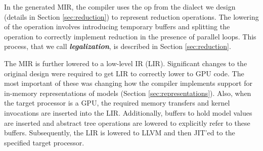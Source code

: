 In the generated MIR, the compiler uses the  op from 
the  dialect we design (details in Section \ref{sec:reduction})
to represent reduction operations. The lowering of the  operation 
involves introducing temporary buffers and splitting the operation  
to correctly implement reduction in the presence of 
parallel loops. This process, that we call \textbf{\emph{legalization}}, is 
described in Section \ref{sec:reduction}. 


The MIR is further lowered to a low-level IR (LIR). 
Significant changes to the original \TreebeardOLD{} design were required to get
LIR to correctly lower to GPU code. The most important of these was 
changing how the compiler implements support for in-memory 
representations of models (Section \ref{sec:representations}).
Also, when the target processor is a GPU, the required memory transfers and kernel
invocations are inserted into the LIR. Additionally, buffers 
to hold model values are inserted and abstract tree operations are lowered to
explicitly refer to these buffers.
Subsequently, the LIR is lowered to LLVM and then JIT'ed to the 
specified target processor.

